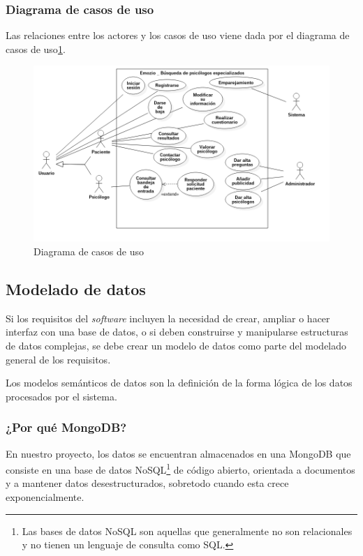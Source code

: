 \subsubsection{Diagrama de casos de uso}
Las relaciones entre los actores y los casos de uso viene dada por el diagrama de casos de uso\ref{fig:diag_casos_uso}.

\begin{figure}[htbp] 
    \centering
    \includegraphics[width=1\textwidth]{figuras/diag_casos_uso.png}
    \caption{Diagrama de casos de uso}
    \label{fig:diag_casos_uso}
\end{figure}	


\subsection{Modelado de datos}
Si los requisitos del \textit{software} incluyen la necesidad de crear, ampliar o hacer interfaz con una base de datos, o si deben construirse y manipularse estructuras de datos complejas, se debe crear un modelo de datos como parte del modelado general de los requisitos.\cite{pressman}


Los modelos semánticos de datos son la definición de la forma lógica de los datos procesados por el sistema. \cite{sommerville}


\subsubsection{¿Por qué MongoDB?}
En nuestro proyecto, los datos se encuentran almacenados en una MongoDB que consiste en una base de datos NoSQL\footnote{Las bases de datos NoSQL son aquellas que generalmente no son relacionales y no tienen un lenguaje de consulta como SQL.} de código abierto, orientada a documentos y a mantener datos desestructurados, sobretodo cuando esta crece exponencialmente. \cite{mongodb_traspas}

